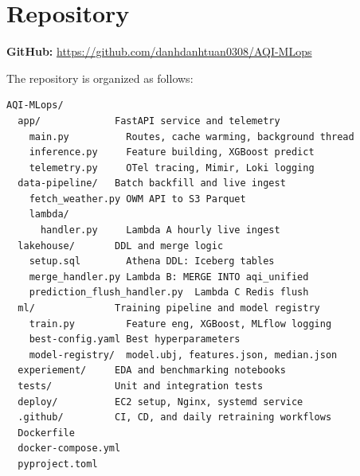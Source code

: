 \documentclass[sigconf, nonacm]{acmart}
\begin{document}
\section*{Repository}

\textbf{GitHub:}
\url{https://github.com/danhdanhtuan0308/AQI-MLops}

\medskip
\noindent
The repository is organized as follows:

\begin{lstlisting}[basicstyle=\footnotesize\ttfamily,
                   frame=none, backgroundcolor=\color{white}]
AQI-MLops/
  app/             FastAPI service and telemetry
    main.py          Routes, cache warming, background thread
    inference.py     Feature building, XGBoost predict
    telemetry.py     OTel tracing, Mimir, Loki logging
  data-pipeline/   Batch backfill and live ingest
    fetch_weather.py OWM API to S3 Parquet
    lambda/
      handler.py     Lambda A hourly live ingest
  lakehouse/       DDL and merge logic
    setup.sql        Athena DDL: Iceberg tables
    merge_handler.py Lambda B: MERGE INTO aqi_unified
    prediction_flush_handler.py  Lambda C Redis flush
  ml/              Training pipeline and model registry
    train.py         Feature eng, XGBoost, MLflow logging
    best-config.yaml Best hyperparameters
    model-registry/  model.ubj, features.json, median.json
  experiement/     EDA and benchmarking notebooks
  tests/           Unit and integration tests
  deploy/          EC2 setup, Nginx, systemd service
  .github/         CI, CD, and daily retraining workflows
  Dockerfile
  docker-compose.yml
  pyproject.toml
\end{lstlisting}
\end{document}
